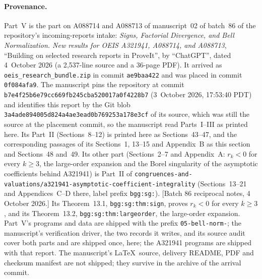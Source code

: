 \documentclass[11pt]{article}
\numberwithin{equation}{section}
\theoremstyle{definition}
\theoremstyle{remark}
\begin{document}
\paragraph{Provenance.}
Part~V is the part on A088714 and A088713 of manuscript~02 of batch~86
of the repository's incoming-reports intake: \emph{Signs, Factorial
Divergence, and Bell Normalization. New results for OEIS A321941,
A088714, and A088713}, ``Building on selected research reports in
ProveIt'', by ``ChatGPT'', dated 4~October 2026 (a 2{,}537-line source
and a 36-page PDF). It arrived as \nolinkurl{oeis_research_bundle.zip} in
commit \texttt{ae9baa422} and was placed in commit \texttt{0f084afa9}.
The manuscript pins the repository at commit
\texttt{b7e4f25b6e79cc669fb245cba520017a0f4228b7} (3~October 2026,
17:53:40 PDT) and identifies this report by the Git blob
\texttt{3a4ade894005d824a4ae3ead0b769253a178e3cf} of its source, which
was still the source at the placement commit, so the manuscript read
Parts~I--III as printed here. Its Part~II (Sections~8--12) is printed
here as Sections~43--47, and the corresponding passages of its
Sections~1, 13--15 and Appendix~B as this section and Sections~48
and~49. Its other part (Sections~2--7 and Appendix~A: $r_k<0$ for every
$k\ge3$, the large-order expansion and the Borel singularity of the
asymptotic coefficients behind A321941) is Part~II of
\nolinkurl{congruences-and-valuations/a321941-asymptotic-coefficient-integrality}
(Sections~13--21 and Appendices~C--D there, label prefix
\texttt{bgg:sg:}). [Batch 86 reciprocal notes, 4 October 2026.] Its
Theorem~13.1, \nolinkurl{bgg:sg:thm:sign}, proves $r_k<0$ for every
$k\ge3$, and its Theorem~13.2, \nolinkurl{bgg:sg:thm:largeorder}, the
large-order expansion.
Part~V's programs and data are shipped with the prefix
\texttt{05-bell-norm-}; the manuscript's verification driver, the two
records it writes, and its source audit cover both parts and are shipped
once, here; the A321941 programs are shipped with that report. The
manuscript's \LaTeX\ source, delivery README, PDF and checksum manifest
are not shipped; they survive in the archive of the arrival commit.
\end{document}
